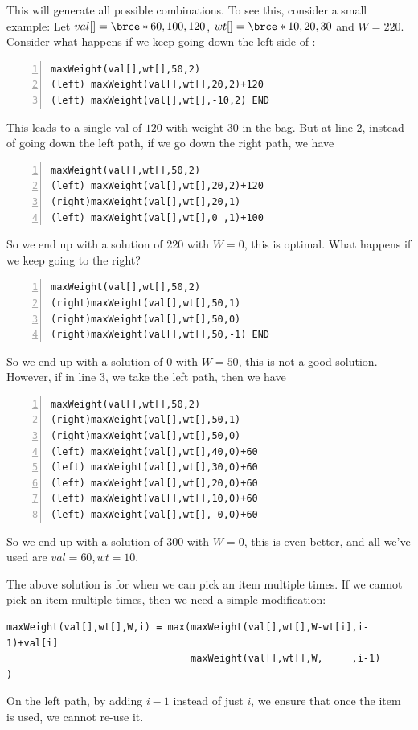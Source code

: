 This will generate all possible combinations. To see this, consider a small
example: Let $val[]=\brce*{60,100,120}$, $wt[]=\brce*{10,20,30}$ and $W=220$.
Consider what happens if we keep going down the left side of :
\begin{lstlisting}[style=raygeneric, numbers=left]
       maxWeight(val[],wt[],50,2)
(left) maxWeight(val[],wt[],20,2)+120
(left) maxWeight(val[],wt[],-10,2) END
\end{lstlisting}
This leads to a single val of $120$ with weight $30$ in the bag. But at line
2, instead of going down the left path, if we go down the right path, we
have 
\begin{lstlisting}[style=raygeneric, numbers=left]
       maxWeight(val[],wt[],50,2)
(left) maxWeight(val[],wt[],20,2)+120
(right)maxWeight(val[],wt[],20,1)
(left) maxWeight(val[],wt[],0 ,1)+100
\end{lstlisting}
So we end up with a solution of 220 with $W=0$, this is optimal. What
happens if we keep going to the right?
\begin{lstlisting}[style=raygeneric, numbers=left]
       maxWeight(val[],wt[],50,2)
(right)maxWeight(val[],wt[],50,1)
(right)maxWeight(val[],wt[],50,0)
(right)maxWeight(val[],wt[],50,-1) END
\end{lstlisting}
So we end up with a solution of 0 with $W=50$, this is not a good solution.
However, if in line 3, we take the left path, then we have
\begin{lstlisting}[style=raygeneric, numbers=left]
       maxWeight(val[],wt[],50,2)
(right)maxWeight(val[],wt[],50,1)
(right)maxWeight(val[],wt[],50,0)
(left) maxWeight(val[],wt[],40,0)+60
(left) maxWeight(val[],wt[],30,0)+60
(left) maxWeight(val[],wt[],20,0)+60
(left) maxWeight(val[],wt[],10,0)+60
(left) maxWeight(val[],wt[], 0,0)+60
\end{lstlisting}
So we end up with a solution of 300 with $W=0$, this is even better, and
all we've used are $val=60, wt=10$.

\qasepline{}

The above solution is for when we can pick an item multiple times. If we
cannot pick an item multiple times, then we need a simple modification:
\begin{lstlisting}[style=raygeneric]
maxWeight(val[],wt[],W,i) = max(maxWeight(val[],wt[],W-wt[i],i-1)+val[i]
                                maxWeight(val[],wt[],W,     ,i-1)       )
\end{lstlisting}
On the left path, by adding $i-1$ instead of just $i$, we ensure that once
the item is used, we cannot re-use it. 

